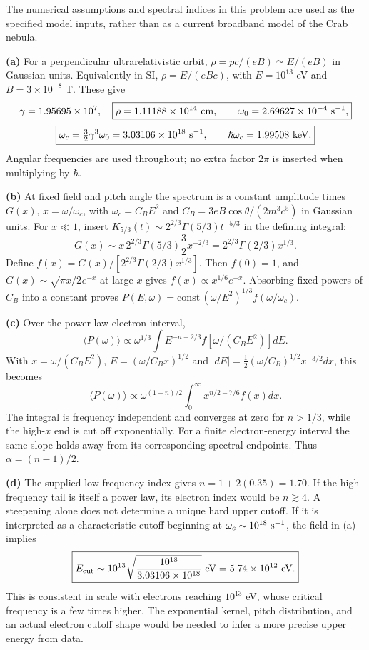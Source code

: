 The numerical assumptions and spectral indices in this problem are
used as the specified model inputs, rather than as a current broadband
model of the Crab nebula.

\textbf{(a)} For a perpendicular ultrarelativistic orbit,
$\rho=pc/(eB)\simeq E/(eB)$ in Gaussian units.
Equivalently in SI, $\rho=E/(eBc)$, with
$E=10^{13}$ eV and $B=3\times10^{-8}$ T. These give
\[
\gamma=1.95695\times10^7,\quad
\boxed{\rho=1.11188\times10^{14}\ {\rm cm},\qquad
\omega_0=2.69627\times10^{-4}\ {\rm s}^{-1},}
\]
\[
\boxed{\omega_c=\tfrac32\gamma^3\omega_0
=3.03106\times10^{18}\ {\rm s}^{-1},\qquad
\hbar\omega_c=1.99508\ {\rm keV}.}
\]
Angular frequencies are used throughout; no extra factor $2\pi$ is
inserted when multiplying by $\hbar$.

\textbf{(b)} At fixed field and pitch angle the spectrum is a constant
amplitude times $G(x)$, $x=\omega/\omega_c$, with
$\omega_c=C_BE^2$ and
$C_B=3eB\cos\theta/(2m^3c^5)$ in Gaussian units.
For $x\ll1$, insert
$K_{5/3}(t)\sim2^{2/3}\Gamma(5/3)t^{-5/3}$ in the defining integral:
\[
G(x)\sim x\,2^{2/3}\Gamma(5/3)\frac32x^{-2/3}
=2^{2/3}\Gamma(2/3)x^{1/3}.
\]
Define
$f(x)=G(x)/[2^{2/3}\Gamma(2/3)x^{1/3}]$.
Then $f(0)=1$, and $G(x)\sim\sqrt{\pi x/2}e^{-x}$ at large $x$ gives
$f(x)\propto x^{1/6}e^{-x}$. Absorbing fixed powers of $C_B$ into a
constant proves $P(E,\omega)=\mathrm{const}\,(
\omega/E^2)^{1/3}f(\omega/\omega_c)$.

\textbf{(c)} Over the power-law electron interval,
\[
\langle P(\omega)\rangle\propto
\omega^{1/3}\int E^{-n-2/3}f[\omega/(C_BE^2)]dE.
\]
With $x=\omega/(C_BE^2)$,
$E=(\omega/C_Bx)^{1/2}$ and
$|dE|=\tfrac12(\omega/C_B)^{1/2}x^{-3/2}dx$, this becomes
\[
\langle P(\omega)\rangle\propto
\omega^{(1-n)/2}\int_0^\infty
x^{n/2-7/6}f(x)dx.
\]
The integral is frequency independent and converges at zero for
$n>1/3$, while the high-$x$ end is cut off exponentially.
For a finite electron-energy interval the same slope holds away from
its corresponding spectral endpoints. Thus $\boxed{\alpha=(n-1)/2}$.

\textbf{(d)} The supplied low-frequency index gives $n=1+2(0.35)=1.70$.
If the high-frequency tail is itself a power law, its electron index
would be $n\gtrsim4$. A steepening alone does not determine a unique hard
upper cutoff. If it is interpreted as a characteristic cutoff beginning
at $\omega_c\sim10^{18}\ {\rm s}^{-1}$, the field in (a) implies
\[
\boxed{E_{\rm cut}\sim10^{13}
\sqrt{\frac{10^{18}}{3.03106\times10^{18}}}\ {\rm eV}
=5.74\times10^{12}\ {\rm eV}.}
\]
This is consistent in scale with electrons reaching $10^{13}$ eV,
whose critical frequency is a few times higher. The exponential kernel,
pitch distribution, and an actual electron cutoff shape would be needed
to infer a more precise upper energy from data.

